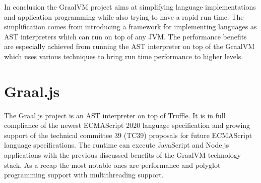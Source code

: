 In conclusion the GraalVM project aims at simplifying language implementations and application programming while also trying to have a rapid run time. The simplification comes from introducing a framework for implementing languages as AST interpreters which can run on top of any JVM. The performance benefits are especially achieved from running the AST interpreter on top of the GraalVM which uses various techniques to bring run time performance to higher levels.
\section{Graal.js}
The Graal.js project is an AST interpreter on top of Truffle. It is in full compliance of the newest ECMAScript 2020 language specification \cite{kangax1, GraaljsComp} and growing support of the technical committee 39 (TC39) proposals for future ECMAScript language specifications. \cite{kangax2, gitTC}  The runtime can execute JavaScript and Node.js applications with the previous discussed benefits of the GraalVM technology stack. \cite{Graaljs} As a recap the most notable ones are performance and polyglot programming support with multithreading support.

